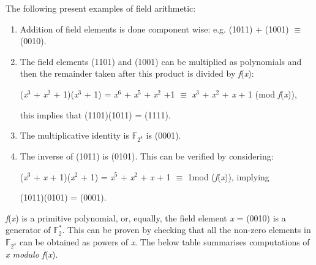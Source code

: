 \documentclass[iwp,first]{luthesis}
\begin{document}
The following present examples of field arithmetic:

\begin{enumerate}

\item Addition of field elements is done component wise: e.g. (1011) + (1001) $\equiv$ (0010).

\item The field elements (1101) and (1001) can be multiplied  as polynomials and then the remainder taken after this product is divided by \textit{f}(\textit{x}):

(\textit{x}$^3$ + \textit{x}$^2$ + 1)(\textit{x}$^3$ + 1) = \textit{x}$^6$ + \textit{x}$^5$ + \textit{x}$^2$ +1 $\equiv$ \textit{x}$^3$ + \textit{x}$^2$ + \textit{x} + 1 (mod \textit{f}(\textit{x})),

this implies that (1101)(1011) = (1111).

\item The multiplicative identity is $\mathbb{F}_{2^4}$ is (0001).

\item The inverse of (1011) is (0101). This can be verified by considering:

(\textit{x}$^3$ + \textit{x} + 1)(\textit{x}$^2$ + 1) = \textit{x}$^5$ + \textit{x}$^2$ + \textit{x} + 1 $\equiv$ 1mod (\textit{f}(\textit{x})), implying 

(1011)(0101) = (0001).

\end{enumerate}

\textit{f}(\textit{x}) is a primitive polynomial, or, equally, the field element \textit{x} = (0010) is a generator of $\mathbb{F}^{*}_{2}$. This can be proven by checking that all the non-zero elements in $\mathbb{F}_{2^4}$ can be obtained as powers of \textit{x}. The below table summarises computations of \textit{x modulo f}(\textit{x}).
\end{document}
